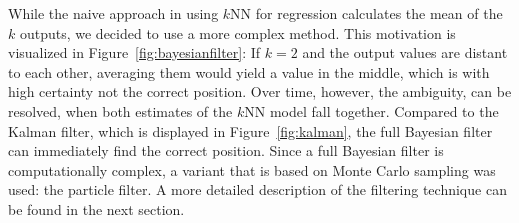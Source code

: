 While the naive approach in using $k$NN for regression calculates the mean of the $k$ outputs, we decided to use a more complex method. This motivation is visualized in Figure~\ref{fig:bayesianfilter}: If $k=2$ and the output values are distant to each other, averaging them would yield a value in the middle, which is with high certainty not the correct position. Over time, however, the ambiguity, can be resolved, when both estimates of the $k$NN model fall together. Compared to the Kalman filter, which is displayed in Figure~\ref{fig:kalman}, the full Bayesian filter can immediately find the correct position. Since a full Bayesian filter is computationally complex, a variant that is based on Monte Carlo sampling was used: the particle filter. A more detailed description of the filtering technique can be found in the next section.  